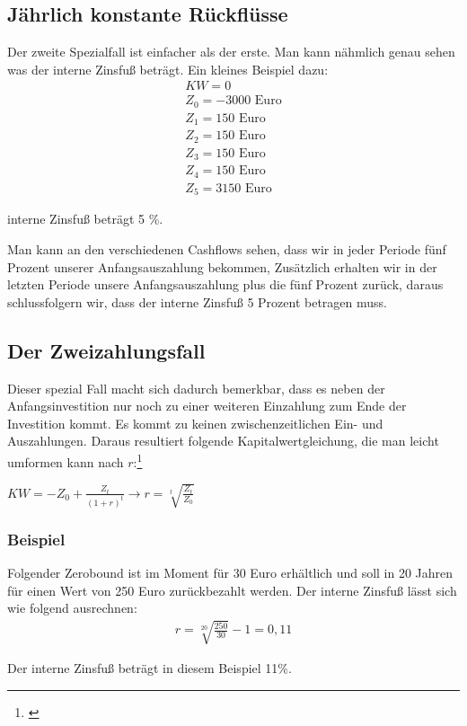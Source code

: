 \subsection{Jährlich konstante Rückflüsse}
Der zweite Spezialfall ist einfacher als der erste. Man kann nähmlich genau sehen was der interne Zinsfuß beträgt. Ein kleines Beispiel dazu:
\begin{align*}
    KW = 0                   \\
    Z_0 = -3000 \text{ Euro} \\
    Z_1 = 150 \text{ Euro}   \\
    Z_2 = 150 \text{ Euro}   \\
    Z_3 = 150 \text{ Euro}   \\
    Z_4 = 150 \text{ Euro}   \\
    Z_5 = 3150 \text{ Euro}
\end{align*}
\begin{center}
    interne Zinsfuß beträgt 5 \%.
\end{center}
Man kann an den verschiedenen Cashflows sehen, dass wir in jeder Periode fünf Prozent unserer Anfangsauszahlung bekommen, Zusätzlich erhalten wir in der letzten Periode unsere Anfangsauszahlung plus die fünf Prozent zurück, daraus schlussfolgern wir, dass der interne Zinsfuß 5 Prozent betragen muss.
\subsection{Der Zweizahlungsfall}
Dieser spezial Fall macht sich dadurch bemerkbar, dass es neben der Anfangsinvestition nur noch zu einer weiteren Einzahlung zum Ende der Investition kommt. Es kommt zu keinen zwischenzeitlichen Ein- und Auszahlungen. Daraus resultiert folgende Kapitalwertgleichung, die man leicht umformen kann nach $r$:\footnote{\cite{lex-interner-zinsfuss}}\\
\begin{center}
    $ KW = -Z_{0} + \frac{Z_{t}}{(1+r)^{t}} \rightarrow r = \sqrt[t]{\frac{Z_t}{Z_0}} $
\end{center}
\newpage
\subsubsection{Beispiel}
Folgender Zerobound ist im Moment für 30 Euro erhältlich und soll in 20 Jahren für einen Wert von 250 Euro zurückbezahlt werden. Der interne Zinsfuß lässt sich wie folgend ausrechnen:
\begin{align*}
    r = \sqrt[20]{\frac{250}{30}} -1 = 0,11
\end{align*}
\begin{center}
    Der interne Zinsfuß beträgt in diesem Beispiel 11\%.
\end{center}
